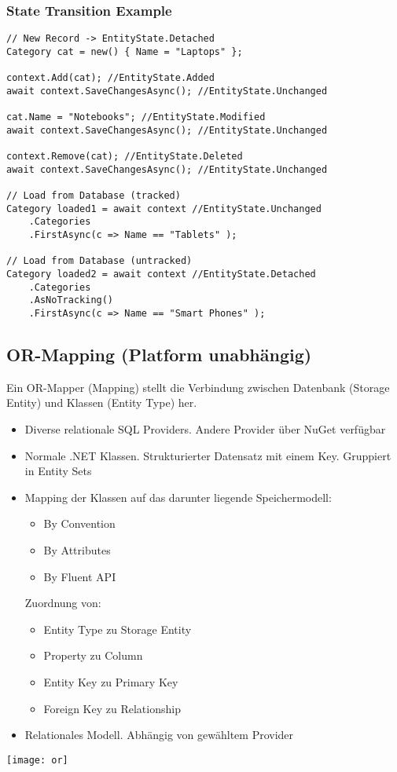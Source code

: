 \begin{multicols*}{2}
\subsubsection{State Transition Example}
\begin{lstlisting}
// New Record -> EntityState.Detached
Category cat = new() { Name = "Laptops" }; 

context.Add(cat); //EntityState.Added
await context.SaveChangesAsync(); //EntityState.Unchanged

cat.Name = "Notebooks"; //EntityState.Modified
await context.SaveChangesAsync(); //EntityState.Unchanged

context.Remove(cat); //EntityState.Deleted
await context.SaveChangesAsync(); //EntityState.Unchanged

// Load from Database (tracked)
Category loaded1 = await context //EntityState.Unchanged
    .Categories
    .FirstAsync(c => Name == "Tablets" ); 

// Load from Database (untracked) 
Category loaded2 = await context //EntityState.Detached
    .Categories
    .AsNoTracking()
    .FirstAsync(c => Name == "Smart Phones" );
\end{lstlisting}

\subsection{OR-Mapping (Platform unabhängig)}
Ein OR-Mapper (Mapping) stellt die Verbindung zwischen Datenbank (Storage Entity) und Klassen (Entity Type) her.
\begin{itemize}
    \item {} Diverse relationale SQL Providers. Andere Provider über NuGet verfügbar
    \item {} Normale .NET Klassen. Strukturierter Datensatz mit einem Key. Gruppiert in Entity Sets
    \item {} Mapping der Klassen auf das darunter liegende Speichermodell:
    \begin{itemize}
        \item By Convention
        \item By Attributes
        \item By Fluent API
    \end{itemize}
    Zuordnung von:
    \begin{itemize}
        \item Entity Type zu Storage Entity
        \item Property zu Column
        \item Entity Key zu Primary Key
        \item Foreign Key zu Relationship
    \end{itemize}
    \item {} Relationales Modell. Abhängig von gewähltem Provider
\end{itemize}
\texttt{[image: or]}

\end{multicols*}
